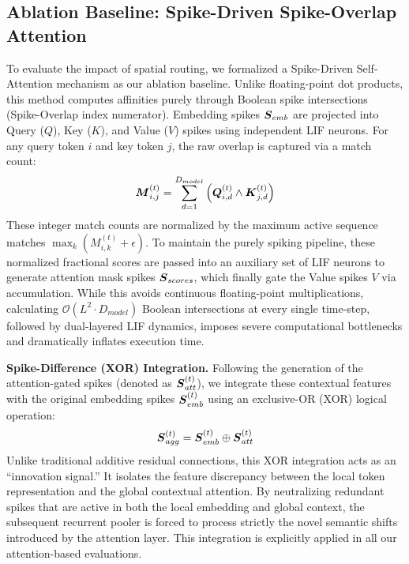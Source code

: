 \documentclass[10pt]{article} %
\begin{document}
\subsection{Ablation Baseline: Spike-Driven Spike-Overlap Attention}
To evaluate the impact of spatial routing, we formalized a Spike-Driven Self-Attention mechanism as our ablation baseline. Unlike floating-point dot products, this method computes affinities purely through Boolean spike intersections (Spike-Overlap index numerator).
Embedding spikes $\boldsymbol{S}_{emb}$ are projected into Query ($Q$), Key ($K$), and Value ($V$) spikes using independent LIF neurons. For any query token $i$ and key token $j$, the raw overlap is captured via a match count:
\begin{equation}
\boldsymbol{M}_{i,j}^{(t)} = \sum_{d=1}^{D_{model}} \left( \boldsymbol{Q}_{i,d}^{(t)} \wedge \boldsymbol{K}_{j,d}^{(t)} \right)
\end{equation}
These integer match counts are normalized by the maximum active sequence matches $\max_k (M_{i,k}^{(t)} + \epsilon)$. To maintain the purely spiking pipeline, these normalized fractional scores are passed into an auxiliary set of LIF neurons to generate attention mask spikes $\boldsymbol{S}_{scores}$, which finally gate the Value spikes $V$ via accumulation.
While this avoids continuous floating-point multiplications, calculating $\mathcal{O}(L^2 \cdot D_{model})$ Boolean intersections at every single time-step, followed by dual-layered LIF dynamics, imposes severe computational bottlenecks and dramatically inflates execution time.

\textbf{Spike-Difference (XOR) Integration.} Following the generation of the attention-gated spikes (denoted as $\boldsymbol{S}_{att}^{(t)}$), we integrate these contextual features with the original embedding spikes $\boldsymbol{S}_{emb}^{(t)}$ using an exclusive-OR (XOR) logical operation:
\begin{equation}
\boldsymbol{S}_{agg}^{(t)} = \boldsymbol{S}_{emb}^{(t)} \oplus \boldsymbol{S}_{att}^{(t)}
\end{equation}
Unlike traditional additive residual connections, this XOR integration acts as an ``innovation signal.'' It isolates the feature discrepancy between the local token representation and the global contextual attention. By neutralizing redundant spikes that are active in both the local embedding and global context, the subsequent recurrent pooler is forced to process strictly the novel semantic shifts introduced by the attention layer. This integration is explicitly applied in all our attention-based evaluations.
\end{document}
